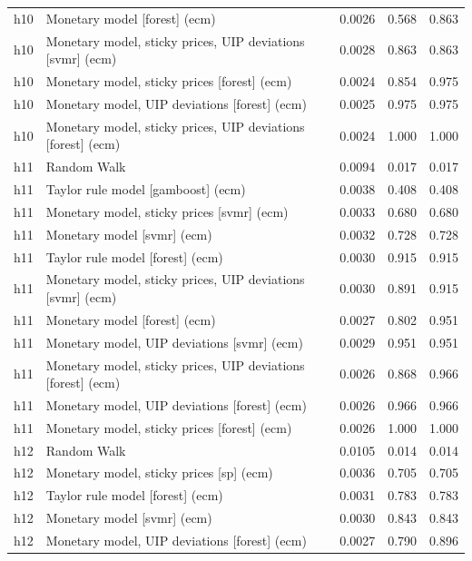 \begin{ThreePartTable}
\begin{longtable}[t]{cp{5.5cm}ccc}
h10 & \raggedright Monetary model [forest] (ecm) & 0.0026 & 0.568 & 0.863\\
h10 & \raggedright Monetary model, sticky prices, UIP deviations [svmr] (ecm) & 0.0028 & 0.863 & 0.863\\
h10 & \raggedright Monetary model, sticky prices [forest] (ecm) & 0.0024 & 0.854 & 0.975\\
h10 & \raggedright Monetary model, UIP deviations [forest] (ecm) & 0.0025 & 0.975 & 0.975\\
h10 & \raggedright Monetary model, sticky prices, UIP deviations [forest] (ecm) & 0.0024 & 1.000 & 1.000\\
\addlinespace
h11 & \raggedright Random Walk & 0.0094 & 0.017 & 0.017\\
h11 & \raggedright Taylor rule model [gamboost] (ecm) & 0.0038 & 0.408 & 0.408\\
h11 & \raggedright Monetary model, sticky prices [svmr] (ecm) & 0.0033 & 0.680 & 0.680\\
h11 & \raggedright Monetary model [svmr] (ecm) & 0.0032 & 0.728 & 0.728\\
h11 & \raggedright Taylor rule model [forest] (ecm) & 0.0030 & 0.915 & 0.915\\
h11 & \raggedright Monetary model, sticky prices, UIP deviations [svmr] (ecm) & 0.0030 & 0.891 & 0.915\\
h11 & \raggedright Monetary model [forest] (ecm) & 0.0027 & 0.802 & 0.951\\
h11 & \raggedright Monetary model, UIP deviations [svmr] (ecm) & 0.0029 & 0.951 & 0.951\\
h11 & \raggedright Monetary model, sticky prices, UIP deviations [forest] (ecm) & 0.0026 & 0.868 & 0.966\\
h11 & \raggedright Monetary model, UIP deviations [forest] (ecm) & 0.0026 & 0.966 & 0.966\\
h11 & \raggedright Monetary model, sticky prices [forest] (ecm) & 0.0026 & 1.000 & 1.000\\
\addlinespace
h12 & \raggedright Random Walk & 0.0105 & 0.014 & 0.014\\
h12 & \raggedright Monetary model, sticky prices [sp] (ecm) & 0.0036 & 0.705 & 0.705\\
h12 & \raggedright Taylor rule model [forest] (ecm) & 0.0031 & 0.783 & 0.783\\
h12 & \raggedright Monetary model [svmr] (ecm) & 0.0030 & 0.843 & 0.843\\
h12 & \raggedright Monetary model, UIP deviations [forest] (ecm) & 0.0027 & 0.790 & 0.896\\

\end{longtable}
\end{ThreePartTable}
